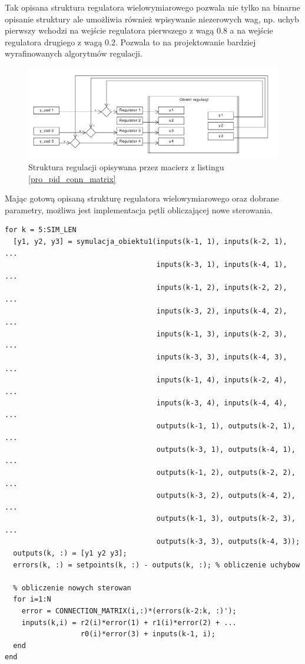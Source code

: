 Tak opisana struktura regulatora wielowymiarowego pozwala nie tylko na binarne opisanie struktury ale 
umożliwia również wpisywanie niezerowych wag, np. uchyb pierwszy wchodzi na wejście regulatora pierwszego
z wagą $\num{0.8}$ a na wejście regulatora drugiego z wagą $\num{0.2}$. Pozwala to 
na projektowanie bardziej wyrafinowanych algorytmów regulacji.

\begin{figure}[p!]
    \centering
\includegraphics[scale=0.7, angle=90]{uklad_regulacji_pid.pdf}
\caption{Struktura regulacji opisywana przez macierz z listingu \ref{pro_pid_conn_matrix}}
\end{figure}

\FloatBarrier

Mając gotową opisaną strukturę regulatora wielowymiarowego oraz dobrane parametry,
możliwa jest implementacja pętli obliczającej nowe sterowania. \\

\begin{lstlisting}[style=custommatlab,frame=single,label={pro_pid_petla},caption={Pętla obliczająca sterowania wielowymiarowego regulatora PID},captionpos=b]
%% Petla symulujaca dzialanie cyfrowego algorytmu PID w wersji MIMO
for k = 5:SIM_LEN  
  [y1, y2, y3] = symulacja_obiektu1(inputs(k-1, 1), inputs(k-2, 1), ...
                                    inputs(k-3, 1), inputs(k-4, 1), ...
                                    inputs(k-1, 2), inputs(k-2, 2), ...
                                    inputs(k-3, 2), inputs(k-4, 2), ...
                                    inputs(k-1, 3), inputs(k-2, 3), ...
                                    inputs(k-3, 3), inputs(k-4, 3), ...
                                    inputs(k-1, 4), inputs(k-2, 4), ...
                                    inputs(k-3, 4), inputs(k-4, 4), ...
                                    outputs(k-1, 1), outputs(k-2, 1), ...
                                    outputs(k-3, 1), outputs(k-4, 1), ...
                                    outputs(k-1, 2), outputs(k-2, 2), ...
                                    outputs(k-3, 2), outputs(k-4, 2), ...
                                    outputs(k-1, 3), outputs(k-2, 3), ...
                                    outputs(k-3, 3), outputs(k-4, 3));
  outputs(k, :) = [y1 y2 y3];                        
  errors(k, :) = setpoints(k, :) - outputs(k, :); % obliczenie uchybow    

  % obliczenie nowych sterowan
  for i=1:N
    error = CONNECTION_MATRIX(i,:)*(errors(k-2:k, :)');
    inputs(k,i) = r2(i)*error(1) + r1(i)*error(2) + ...
                  r0(i)*error(3) + inputs(k-1, i); 
  end
end
\end{lstlisting}

